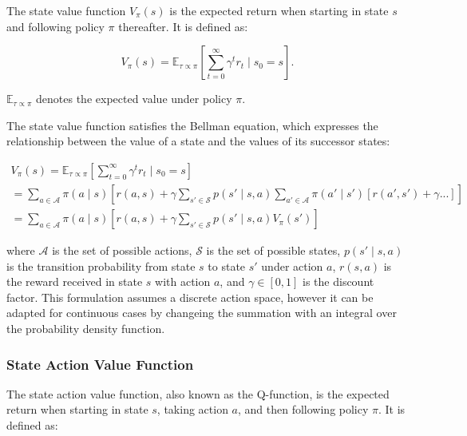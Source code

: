 The state value function $V_{\pi}(s)$ is the expected return when starting in state $s$ and following policy $\pi$ thereafter. It is defined as:

\begin{equation}
    \label{eq:value_func_proper}
    V_{\pi}(s) = \mathbb{E}_{\tau \propto \pi}\left[\sum_{t=0}^{\infty} \gamma^t r_t \mid s_0 = s\right].
\end{equation}

$\mathbb{E}_{\tau \propto \pi}$ denotes the expected value under policy $\pi$.

The state value function satisfies the Bellman equation, which expresses the relationship between the value of a state and the values of its successor states:

\begin{equation}
    \label{bootstrap_v}
    \begin{aligned}
        V_{\pi}(s) = \mathbb{E}_{\tau \propto \pi}\left[\sum_{t=0}^{\infty} \gamma^t r_t \mid s_0 = s\right] \\
        = \sum_{a \in \mathcal{A}} \pi(a \mid s) \left[ r(a,s)  + \gamma \sum_{s' \in \mathcal{S}} p(s' \mid s,a) \sum_{a' \in \mathcal{A}} \pi(a' \mid s') \left[ r(a',s') + \gamma ...\right] \right]\\
        = \sum_{a \in \mathcal{A}} \pi(a \mid s) \left[ r(a,s) +  \gamma \sum_{s' \in \mathcal{S}} p(s' \mid s,a) V_{\pi}(s')\right]
    \end{aligned}
\end{equation}

where $\mathcal{A}$ is the set of possible actions, $\mathcal{S}$ is the set of possible states, $p(s' \mid s,a)$ is the transition probability 
from state $s$ to state $s'$ under action $a$, $r(s,a)$ is the reward received in state $s$ with action $a$, and $\gamma \in [0,1]$ is the discount factor. 
This formulation assumes a discrete action space,
however it can be adapted for continuous cases by changeing the summation with an integral over the probability density function.

\subsubsection{State Action Value Function}

The state action value function, also known as the Q-function, is the expected return when starting in state $s$, taking action $a$, and then following 
policy $\pi$. It is defined as:

